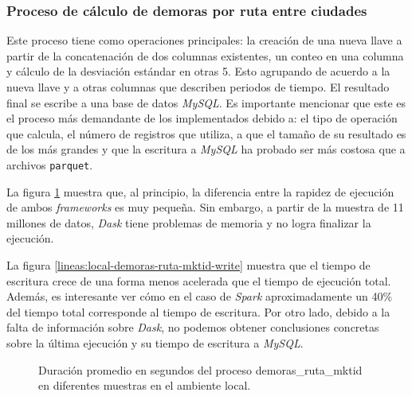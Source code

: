\subsubsection{Proceso de cálculo de demoras por ruta entre ciudades}

Este proceso tiene como operaciones principales: la creación de una nueva llave a partir de la concatenación de dos columnas existentes, un conteo en una columna y cálculo de la desviación estándar en otras 5. Esto agrupando de acuerdo a la nueva llave y a otras columnas que describen periodos de tiempo. El resultado final se escribe a una base de datos \textit{MySQL}. Es importante mencionar que este es el proceso más demandante de los implementados debido a: el tipo de operación que calcula, el número de registros que utiliza, a que el tamaño de su resultado es de los más grandes y que la escritura a \textit{MySQL} ha probado ser más costosa que a archivos \texttt{parquet}.

La figura \ref{lineas:local-demoras-ruta-mktid} muestra que, al principio, la diferencia entre la rapidez de ejecución de ambos \textit{frameworks} es muy pequeña. Sin embargo, a partir de la muestra de 11 millones de datos, \textit{Dask} tiene problemas de memoria y no logra finalizar la ejecución.

La figura \ref{lineas:local-demoras-ruta-mktid-write} muestra que el tiempo de escritura crece de una forma menos acelerada que el tiempo de ejecución total. Además, es interesante ver cómo en el caso de \textit{Spark} aproximadamente un 40\% del tiempo total corresponde al tiempo de escritura. Por otro lado, debido a la falta de información sobre \textit{Dask}, no podemos obtener conclusiones concretas sobre la última ejecución y su tiempo de escritura a \textit{MySQL}. 

\begin{figure}
\centering
{}
\caption{Duración promedio en segundos del proceso demoras\_ruta\_mktid en diferentes muestras en el ambiente local.}
\label{lineas:local-demoras-ruta-mktid}
\end{figure}


